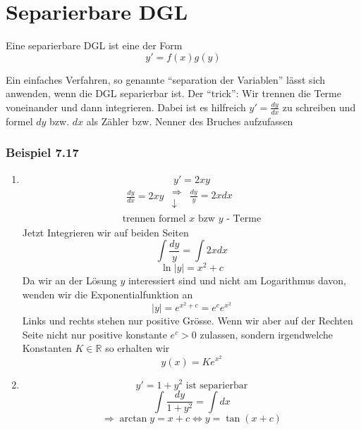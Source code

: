 \section{Separierbare DGL}
\begin{definition}{7.16}
Eine separierbare DGL ist eine der Form $$y'=f(x)g(y)$$
\end{definition}
Ein einfaches Verfahren, so genannte ``separation der Variablen'' lässt sich anwenden, wenn die DGL separierbar ist. Der ``trick'': Wir trennen die Terme voneinander und dann integrieren. Dabei ist es hilfreich $y'=\frac{dy}{dx}$ zu schreiben und formel $dy$ bzw. $dx$ als Zähler bzw. Nenner des Bruches aufzufassen

\subsubsection*{Beispiel 7.17}
\begin{enumerate}
\item $$y'=2xy$$\[\begin{array}{l}
\begin{array}{*{20}{c}}
{\frac{{dy}}{{dx}} = 2xy}\\
{}
\end{array}\begin{array}{*{20}{c}}
 \Rightarrow \\
 \downarrow 
\end{array}\begin{array}{*{20}{c}}
{\frac{{dy}}{y} = 2xdx}\\
{}
\end{array}\\
{\text{trennen formel }}x{\text{ bzw }}y{\text{ - Terme}}
\end{array}\]
Jetzt Integrieren wir auf beiden Seiten $$\int{\frac{dy}{y}}=\int{2xdx}$$$$\ln\left| y\right|=x^2+c$$Da wir an der Lösung $y$ interessiert sind und nicht am Logarithmus davon, wenden wir die Exponentialfunktion an $$\left| y\right|=e^{x^2+c}=e^ce^{x^2}$$
Links und rechts stehen nur positive Grösse. Wenn wir aber auf der Rechten Seite nicht nur positive konstante $e^c>0$ zulassen, sondern irgendwelche Konstanten $K\in\mathbb{R}$ so erhalten wir $$y(x)=Ke^{x^2}$$
\item $$y'=1+y^2\text{ ist separierbar}$$
$$\int{\frac{dy}{1+y^2}=\int{dx}}$$
$$\Rightarrow \arctan y=x+c \Leftrightarrow y=\tan(x+c)$$
\end{enumerate}
